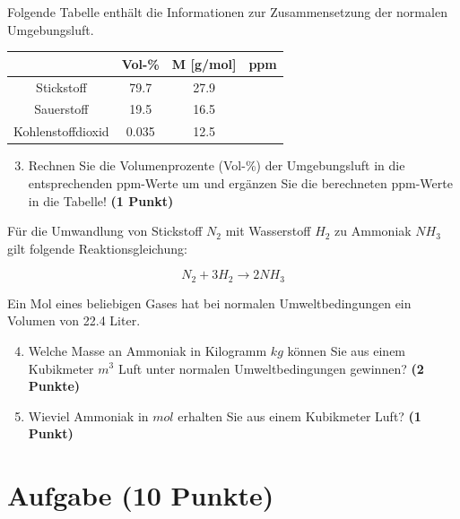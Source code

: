\documentclass[a4paper, 9pt]{scrartcl}\usepackage[]{graphicx}\usepackage[]{xcolor}
\begin{document}
Folgende Tabelle enth{\"a}lt die Informationen zur Zusammensetzung der
normalen Umgebungsluft.

\begin{center}
  \begin{tabular}{ c|c|c|c }
     & Vol-\% & M [g/mol] & ppm \\
    \hline
    Stickstoff & 79.7 & 27.9 &
                                                    \phantom{1000000000000}\strut\\
        \hline
    Sauerstoff & 19.5 & 16.5 &
                                                    \phantom{10000000}\strut\\
        \hline
    Kohlenstoffdioxid & 0.035 & 12.5 & \phantom{10000000}\strut\\     
     \hline
\end{tabular}
\end{center}

\begin{enumerate}
   \setcounter{enumi}{2}
\item Rechnen Sie die Volumenprozente (Vol-\%) der Umgebungsluft in die
  entsprechenden ppm-Werte um und erg{\"a}nzen Sie die berechneten ppm-Werte in
  die Tabelle!  \textbf{(1 Punkt)}
\end{enumerate}

F{\"u}r die Umwandlung von Stickstoff $N_2$ mit Wasserstoff $H_2$ zu Ammoniak
$NH_3$ gilt folgende Reaktionsgleichung:

\begin{equation*}
  N_2 + 3H_2 \rightarrow 2NH_3
\end{equation*}  

Ein Mol eines beliebigen Gases hat bei normalen Umweltbedingungen ein
Volumen von 22.4 Liter. %

\begin{enumerate}
  \setcounter{enumi}{3}
\item Welche Masse an Ammoniak in Kilogramm $kg$ k{\"o}nnen Sie aus einem
  Kubikmeter $m^3$ Luft unter normalen Umweltbedingungen gewinnen?
  \textbf{(2 Punkte)}
\item Wieviel Ammoniak in $mol$ erhalten Sie aus einem Kubikmeter Luft?
  \textbf{(1 Punkt)}
\end{enumerate}

 
\clearpage

\section{Aufgabe \hfill (10 Punkte)}
\end{document}
